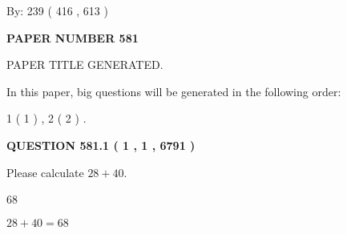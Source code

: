 \documentclass[12pt]{article}
\begin{document}
   
\hspace{1.0in} By: 
 239 ( 416 ,  613 )
   
   
   
   
\newpage 
\setcounter{page}{ 
   581001 } 
   
   
   
   
 {\textbf{ \Large{ PAPER NUMBER  581  }}}
   
   
\vspace{0.2in}
   
   
   
   
   
   
   
   
 \vspace{0.2in}
 
 
 
 
   
   
 PAPER TITLE GENERATED.
   
   
   
\vspace{0.2in}
   
In this paper, big questions will be generated in the following order: 
   
   
   1 ( 1 )
 ,
   2 ( 2 )
 .
  
\vspace{0.2in}
  
{\textbf{\Large{QUESTION
581.1 
 ( 1 , 1 , 6791 )
}}}
  
  
 
Please calculate $ %
28 +  %
40 $.
 
 
 
\noindent{}
 
 

68
 
 
\noindent{}
 
 

 
 
 
\noindent{}
 
 

$ %
28 +  %
40=   %
68$
 
 
\noindent{}
 
\end{document}
